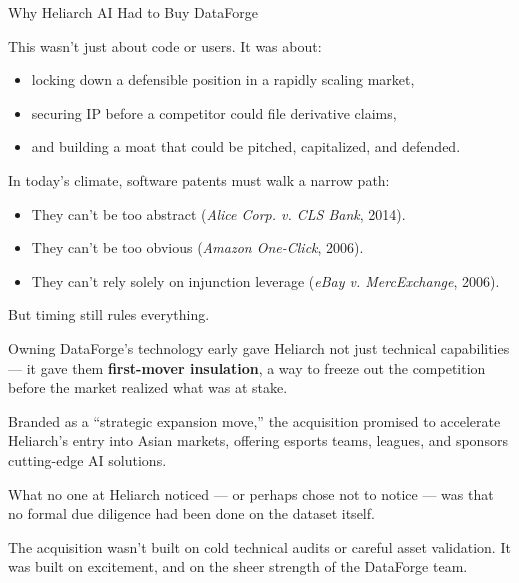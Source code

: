 \begin{HistoricalSidebar}{Why Heliarch AI Had to Buy DataForge}
    \medskip
    
    This wasn’t just about code or users. It was about:

    \medskip

    \begin{itemize}
    \item locking down a defensible position in a rapidly scaling market,
    \item securing IP before a competitor could file derivative claims,
    \item and building a moat that could be pitched, capitalized, and defended.
    \end{itemize}
    
    \medskip
    
    In today’s climate, software patents must walk a narrow path:

    \medskip

    \begin{itemize}
    \item They can’t be too abstract (\textit{Alice Corp. v. CLS Bank}, 2014).
    \item They can’t be too obvious (\textit{Amazon One-Click}, 2006).
    \item They can’t rely solely on injunction leverage (\textit{eBay v. MercExchange}, 2006).
    \end{itemize}

    \medskip
    
    But timing still rules everything.

    \medskip
    
    Owning DataForge’s technology early gave Heliarch not just technical capabilities — it gave them \textbf{first-mover insulation}, a way to freeze out the competition before the market realized what was at stake.
    
\end{HistoricalSidebar}




Branded as a “strategic expansion move,” the acquisition promised to accelerate Heliarch’s entry into Asian markets, offering esports teams, leagues, and sponsors cutting-edge AI solutions.

What no one at Heliarch noticed --- or perhaps chose not to notice --- was that no formal due diligence had been done on the dataset itself.

The acquisition wasn’t built on cold technical audits or careful asset validation. It was built on excitement, and on the sheer strength of the DataForge team.

